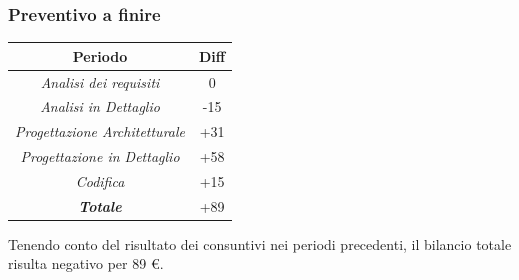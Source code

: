 \begin{frame}
	\frametitle{Preventivo a finire}
	
	\begin{center}
		\centering
		\begin{tabular}{|c|c|}
			\hline
			\textbf{Periodo} & \textbf{Diff} \\
			\hline
			\emph{Analisi dei requisiti}  & 0 \\
			\hline  \emph{Analisi in Dettaglio}  & -15 \\
			\hline  \emph{Progettazione Architetturale}  & +31 \\
			\hline  \emph{Progettazione in Dettaglio}  & +58 \\
			\hline  \emph{Codifica}  & +15 \\
			\hline  \emph{\textbf{Totale}}  & +89 \\
			\hline
		\end{tabular}
	\end{center}
	
Tenendo conto del risultato dei consuntivi nei periodi precedenti, il bilancio totale risulta negativo per 89 \euro.\\

\end{frame}

